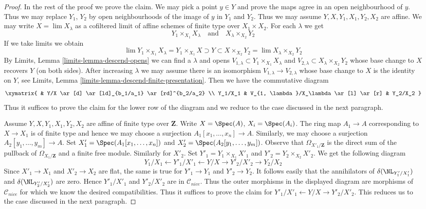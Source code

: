 \begin{proof}
\medskip\noindent
In the rest of the proof we prove the claim. We may pick a point
$y \in Y$ and prove the maps agree in an open neighbourhood of $y$.
Thus we may replace $Y_1$, $Y_2$ by open neighbourhoods of the
image of $y$ in $Y_1$ and $Y_2$. Thus we may assume
$Y, X, Y_1, X_1, Y_2, X_2$ are affine.
We may write $X = \lim X_\lambda$ as a cofiltered limit of affine
schemes of finite type over $X_1 \times X_2$. For each $\lambda$
we get
$$
Y_1 \times_{X_1} X_\lambda
\quad\text{and}\quad
X_\lambda \times_{X_2} Y_2
$$
If we take limits we obtain
$$
\lim Y_1 \times_{X_1} X_\lambda =
Y_1 \times_{X_1} X \supset Y \subset
X \times_{X_2} Y_2 = \lim X_\lambda \times_{X_2} Y_2
$$
By Limits, Lemma \ref{limits-lemma-descend-opens}
we can find a $\lambda$ and opens
$V_{1, \lambda} \subset Y_1 \times_{X_1} X_\lambda$ and
$V_{2, \lambda} \subset X_\lambda \times_{X_2} Y_2$
whose base change to $X$ recovers $Y$ (on both sides).
After increasing $\lambda$ we may assume
there is an isomorphism
$V_{1, \lambda} \to V_{2, \lambda}$ whose base change to $X$ is the
identity on $Y$, see
Limits, Lemma \ref{limits-lemma-descend-finite-presentation}.
Then we have the commutative diagram
$$
\xymatrix{
& Y/X \ar[d] \ar[ld]_{b_1/a_1} \ar[rd]^{b_2/a_2} \\
Y_1/X_1 & V_{1, \lambda}/X_\lambda \ar[l] \ar[r] & Y_2/X_2
}
$$
Thus it suffices to prove the claim for the lower row
of the diagram and we reduce to the case discussed in the
next paragraph.

\medskip\noindent
Assume $Y, X, Y_1, X_1, Y_2, X_2$ are affine of finite type over $\mathbf{Z}$.
Write $X = \Spec(A)$, $X_i = \Spec(A_i)$. The ring map $A_1 \to A$ corresponding
to $X \to X_1$ is of finite type and hence we may choose a surjection
$A_1[x_1, \ldots, x_n] \to A$. Similarly, we may choose a surjection
$A_2[y_1, \ldots, y_m] \to A$. Set $X'_1 = \Spec(A_1[x_1, \ldots, x_n])$
and $X'_2 = \Spec(A_2[y_1, \ldots, y_m])$. Observe that
$\Omega_{X'_1/\mathbf{Z}}$ is the direct sum of the pullback of
$\Omega_{X_1/\mathbf{Z}}$ and a finite free module.
Similarly for $X'_2$. Set $Y'_1 = Y_1 \times_{X_1} X'_1$ and
$Y'_2 = Y_2 \times_{X_2} X'_2$. We get the following diagram
$$
Y_1/X_1 \leftarrow
Y'_1/X'_1 \leftarrow
Y/X
\rightarrow Y'_2/X'_2
\rightarrow Y_2/X_2
$$
Since $X'_1 \to X_1$ and $X'_2 \to X_2$ are flat, the same is true
for $Y'_1 \to Y_1$ and $Y'_2 \to Y_2$. It follows easily that the
annihilators of $\delta(\NL_{Y'_1/X'_1})$ and $\delta(\NL_{Y'_2/X'_2})$
are zero.
Hence $Y'_1/X'_1$ and $Y'_2/X'_2$ are in $\mathcal{C}_{nice}$.
Thus the outer morphisms in the displayed diagram are morphisms
of $\mathcal{C}_{nice}$ for which we know the desired compatibilities.
Thus it suffices to prove the claim for
$Y'_1/X'_1 \leftarrow Y/X \rightarrow Y'_2/X'_2$. This reduces us
to the case discussed in the next paragraph.


\end{proof}
